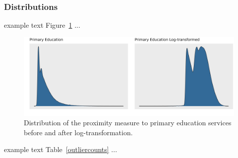 \documentclass[11pt, a4paper]{article}
\begin{document}
\subsubsection{Distributions}

example text Figure~\ref{comparedist} ...




\begin{figure}[H]
\centering
\includegraphics[width=\textwidth]{./distributions/compare_distributions.png}
\caption[Comparison of distributions]{Distribution of the proximity measure to primary education services before and after log-transformation.}\label{comparedist}
\end{figure}






example text Table~\ref{outliercounts} ...


\begin{table}[h]
\centering
\caption[Number of outliers]{The number of outliers in each amenity in the PMD before and after log-transformation.}\label{outliercounts}
\end{table}
\end{document}
